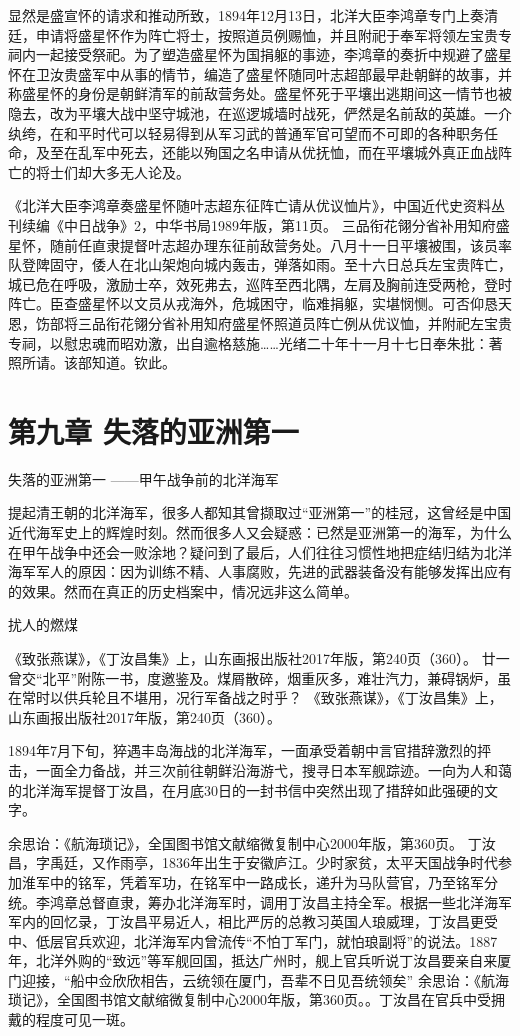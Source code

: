 \documentclass[12pt,UTF8]{ctexbook}
\begin{document}
显然是盛宣怀的请求和推动所致，1894年12月13日，北洋大臣李鸿章专门上奏清廷，申请将盛星怀作为阵亡将士，按照道员例赐恤，并且附祀于奉军将领左宝贵专祠内一起接受祭祀。为了塑造盛星怀为国捐躯的事迹，李鸿章的奏折中规避了盛星怀在卫汝贵盛军中从事的情节，编造了盛星怀随同叶志超部最早赴朝鲜的故事，并称盛星怀的身份是朝鲜清军的前敌营务处。盛星怀死于平壤出逃期间这一情节也被隐去，改为平壤大战中坚守城池，在巡逻城墙时战死，俨然是名前敌的英雄。一介纨绔，在和平时代可以轻易得到从军习武的普通军官可望而不可即的各种职务任命，及至在乱军中死去，还能以殉国之名申请从优抚恤，而在平壤城外真正血战阵亡的将士们却大多无人论及。

《北洋大臣李鸿章奏盛星怀随叶志超东征阵亡请从优议恤片》，中国近代史资料丛刊续编《中日战争》2，中华书局1989年版，第11页。
三品衔花翎分省补用知府盛星怀，随前任直隶提督叶志超办理东征前敌营务处。八月十一日平壤被围，该员率队登陴固守，倭人在北山架炮向城内轰击，弹落如雨。至十六日总兵左宝贵阵亡，城已危在呼吸，激励士卒，效死弗去，巡阵至西北隅，左肩及胸前连受两枪，登时阵亡。臣查盛星怀以文员从戎海外，危城困守，临难捐躯，实堪悯恻。可否仰恳天恩，饬部将三品衔花翎分省补用知府盛星怀照道员阵亡例从优议恤，并附祀左宝贵专祠，以慰忠魂而昭劝激，出自逾格慈施……光绪二十年十一月十七日奉朱批：著照所请。该部知道。钦此。 

\chapter{第九章 失落的亚洲第一}

失落的亚洲第一
——甲午战争前的北洋海军

提起清王朝的北洋海军，很多人都知其曾撷取过“亚洲第一”的桂冠，这曾经是中国近代海军史上的辉煌时刻。然而很多人又会疑惑：已然是亚洲第一的海军，为什么在甲午战争中还会一败涂地？疑问到了最后，人们往往习惯性地把症结归结为北洋海军军人的原因：因为训练不精、人事腐败，先进的武器装备没有能够发挥出应有的效果。然而在真正的历史档案中，情况远非这么简单。

扰人的燃煤

《致张燕谋》，《丁汝昌集》上，山东画报出版社2017年版，第240页（360）。
廿一曾交“北平”附陈一书，度邀鉴及。煤屑散碎，烟重灰多，难壮汽力，兼碍锅炉，虽在常时以供兵轮且不堪用，况行军备战之时乎？ 《致张燕谋》，《丁汝昌集》上，山东画报出版社2017年版，第240页（360）。

1894年7月下旬，猝遇丰岛海战的北洋海军，一面承受着朝中言官措辞激烈的抨击，一面全力备战，并三次前往朝鲜沿海游弋，搜寻日本军舰踪迹。一向为人和蔼的北洋海军提督丁汝昌，在月底30日的一封书信中突然出现了措辞如此强硬的文字。

余思诒：《航海琐记》，全国图书馆文献缩微复制中心2000年版，第360页。
丁汝昌，字禹廷，又作雨亭，1836年出生于安徽庐江。少时家贫，太平天国战争时代参加淮军中的铭军，凭着军功，在铭军中一路成长，递升为马队营官，乃至铭军分统。李鸿章总督直隶，筹办北洋海军时，调用丁汝昌主持全军。根据一些北洋海军军内的回忆录，丁汝昌平易近人，相比严厉的总教习英国人琅威理，丁汝昌更受中、低层官兵欢迎，北洋海军内曾流传“不怕丁军门，就怕琅副将”的说法。1887年，北洋外购的“致远”等军舰回国，抵达广州时，舰上官兵听说丁汝昌要亲自来厦门迎接，“船中佥欣欣相告，云统领在厦门，吾辈不日见吾统领矣” 余思诒：《航海琐记》，全国图书馆文献缩微复制中心2000年版，第360页。。丁汝昌在官兵中受拥戴的程度可见一斑。
\end{document}
